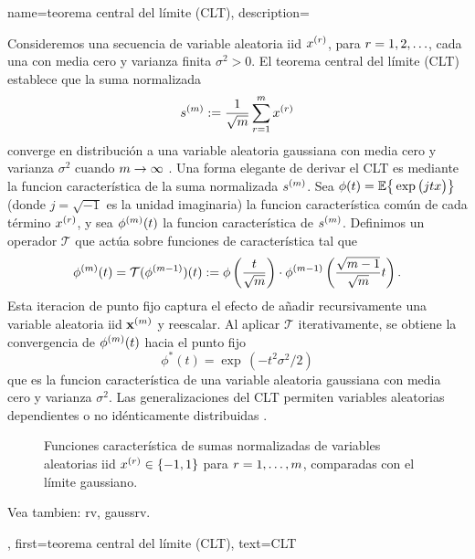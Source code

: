 {name={teorema central del límite (CLT)},
description={Consideremos una secuencia de variable aleatoria iid \( x^{(r)} \), para \( r = 1, 2, \ldots \), 
cada una con media cero y varianza finita \( \sigma^2 > 0 \). 
El  teorema central del límite (CLT) establece que la suma normalizada
\[
s^{(m)} := \frac{1}{\sqrt{m}} \sum_{r = 1}^{m} x^{(r)} 
\]
converge en distribución a una variable aleatoria gaussiana con media cero y varianza \( \sigma^2 \) cuando \( m \to \infty \) \cite[Proposition~2.17]{AsympVanderVaartBook}. 
Una forma elegante de derivar el CLT es mediante la funcion característica de la suma normalizada \( s^{(m)} \). 
Sea $ \phi(t) = \mathbb{E} \big\{ \exp \big( j t x \big) \big\}$ (donde $j = \sqrt{-1}$ es la unidad imaginaria) 
la funcion característica común de cada término $x^{(r)}$, y sea \( \phi^{(m)}(t) \) 
la funcion característica de \( s^{(m)} \). Definimos un operador \( \mathcal{T} \) que actúa sobre funciones de característica 
tal que
\[
\phi^{(m)}(t) = \mathcal{T}(\phi^{(m-1)})(t) := \phi\left( \frac{t}{\sqrt{m}} \right) \cdot \phi^{(m-1)}\left( \frac{\sqrt{m-1}}{\sqrt{m}} t \right).
\]
Esta iteracion de punto fijo captura el efecto de añadir recursivamente una variable aleatoria iid ${\bf x}^{(m)}$ 
y reescalar. Al aplicar \( \mathcal{T} \) iterativamente, se obtiene la convergencia de \( \phi^{(m)}(t) \) hacia el punto fijo
\[
\phi^*(t) = \exp\,(-t^2 \sigma^2 / 2)
\]
que es la funcion característica de una variable aleatoria gaussiana con media cero y varianza \( \sigma^2 \). 
Las generalizaciones del CLT permiten variables aleatorias dependientes o no idénticamente distribuidas \cite[Sec.~2.8]{AsympVanderVaartBook}.
\begin{figure}[H]
\centering
{}
\caption{Funciones característica de sumas normalizadas de variables aleatorias iid $x^{(r)} \in \{-1,1\}$ 
para $r=1,\ldots,m$, comparadas con el límite gaussiano.}
\end{figure}
Vea tambien: \gls{rv}, \gls{gaussrv}.},
first={teorema central del límite (CLT)},
text={CLT}
}



